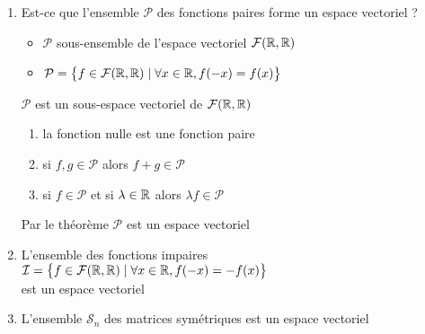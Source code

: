\begin{frame}
\begin{exemple}
\begin{enumerate}
  \item Est-ce que l'ensemble $\mathcal{P}$ des fonctions paires  forme un espace vectoriel ?

  \pause
  
  \begin{itemize}
    \item $\mathcal{P}$ sous-ensemble de l'espace vectoriel $\mathcal{F}(\mathbb{R},\mathbb{R})$
  \pause
    \item $\mathcal{P}=\big\{ f \in \mathcal{F}(\mathbb{R}, \mathbb{R} ) \mid \forall x \in \mathbb{R} , f(-x)=f(x) \big\}$
  \end{itemize}
\pause
 $\mathcal{P}$ est un sous-espace vectoriel de $\mathcal{F}(\mathbb{R},\mathbb{R})$
    \pause 
  \begin{enumerate}
    \item la fonction nulle est une fonction paire 
    \pause
    \item si $f,g \in \mathcal{P}$ alors $f+g \in\mathcal{P}$
    \pause
    \item si $f\in\mathcal{P}$ et si $\lambda \in \mathbb{R}$ alors $\lambda f\in\mathcal{P}$
  \end{enumerate} 
  \pause
  Par le théorème $\mathcal{P}$ est un espace vectoriel
\pause  
  \item L'ensemble des fonctions impaires \\
  \hfil $\mathcal{I}=\big\{ f \in \mathcal{F}(\mathbb{R}, \mathbb{R} ) \mid \forall x \in \mathbb{R} , f(-x)=-f(x) \big\}$ \\
  est un espace vectoriel
\pause  
  \item L'ensemble $\mathcal{S}_n$ des matrices symétriques est un espace vectoriel
  
\end{enumerate}
\end{exemple} 
\end{frame}


